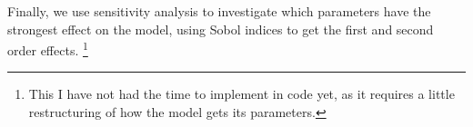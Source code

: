 Finally, we use sensitivity analysis to investigate which parameters have the
strongest effect on the model, using Sobol indices to get the first and second
order effects. \footnote{This I have not had the time to implement in code yet,
as it requires a little restructuring of how the model gets its parameters.}


%
%

